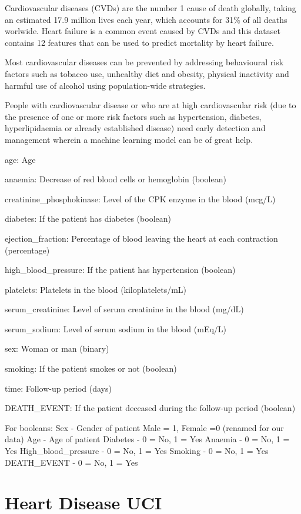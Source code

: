 \documentclass[
  letterpaper,
]{krantz}
\begin{document}
Cardiovascular diseases (CVDs) are the number 1 cause of death globally,
taking an estimated 17.9 million lives each year, which accounts for
31\% of all deaths worlwide. Heart failure is a common event caused by
CVDs and this dataset contains 12 features that can be used to predict
mortality by heart failure.

Most cardiovascular diseases can be prevented by addressing behavioural
risk factors such as tobacco use, unhealthy diet and obesity, physical
inactivity and harmful use of alcohol using population-wide strategies.

People with cardiovascular disease or who are at high cardiovascular
risk (due to the presence of one or more risk factors such as
hypertension, diabetes, hyperlipidaemia or already established disease)
need early detection and management wherein a machine learning model can
be of great help.

age: Age

anaemia: Decrease of red blood cells or hemoglobin (boolean)

creatinine\_phosphokinase: Level of the CPK enzyme in the blood (mcg/L)

diabetes: If the patient has diabetes (boolean)

ejection\_fraction: Percentage of blood leaving the heart at each
contraction (percentage)

high\_blood\_pressure: If the patient has hypertension (boolean)

platelets: Platelets in the blood (kiloplatelets/mL)

serum\_creatinine: Level of serum creatinine in the blood (mg/dL)

serum\_sodium: Level of serum sodium in the blood (mEq/L)

sex: Woman or man (binary)

smoking: If the patient smokes or not (boolean)

time: Follow-up period (days)

DEATH\_EVENT: If the patient deceased during the follow-up period
(boolean)

For booleans: Sex - Gender of patient Male = 1, Female =0 (renamed for
our data) Age - Age of patient Diabetes - 0 = No, 1 = Yes Anaemia - 0 =
No, 1 = Yes High\_blood\_pressure - 0 = No, 1 = Yes Smoking - 0 = No, 1
= Yes DEATH\_EVENT - 0 = No, 1 = Yes

\section{Heart Disease UCI}\label{sec-dd-heart-disease-uci}
\end{document}
